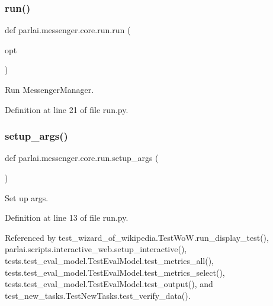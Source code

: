\subsubsection{\texorpdfstring{run()}{run()}}
{\footnotesize\ttfamily def parlai.\+messenger.\+core.\+run.\+run (\begin{DoxyParamCaption}\item[{}]{opt }\end{DoxyParamCaption})}

\begin{DoxyVerb}Run MessengerManager.\end{DoxyVerb}
 

Definition at line 21 of file run.\+py.

\mbox{\label{namespaceparlai_1_1messenger_1_1core_1_1run_a32e58ff98e486caecc5f8941e70db244}} 
\subsubsection{\texorpdfstring{setup\+\_\+args()}{setup\_args()}}
{\footnotesize\ttfamily def parlai.\+messenger.\+core.\+run.\+setup\+\_\+args (\begin{DoxyParamCaption}{ }\end{DoxyParamCaption})}

\begin{DoxyVerb}Set up args.\end{DoxyVerb}
 

Definition at line 13 of file run.\+py.



Referenced by test\+\_\+wizard\+\_\+of\+\_\+wikipedia.\+Test\+Wo\+W.\+run\+\_\+display\+\_\+test(), parlai.\+scripts.\+interactive\+\_\+web.\+setup\+\_\+interactive(), tests.\+test\+\_\+eval\+\_\+model.\+Test\+Eval\+Model.\+test\+\_\+metrics\+\_\+all(), tests.\+test\+\_\+eval\+\_\+model.\+Test\+Eval\+Model.\+test\+\_\+metrics\+\_\+select(), tests.\+test\+\_\+eval\+\_\+model.\+Test\+Eval\+Model.\+test\+\_\+output(), and test\+\_\+new\+\_\+tasks.\+Test\+New\+Tasks.\+test\+\_\+verify\+\_\+data().

